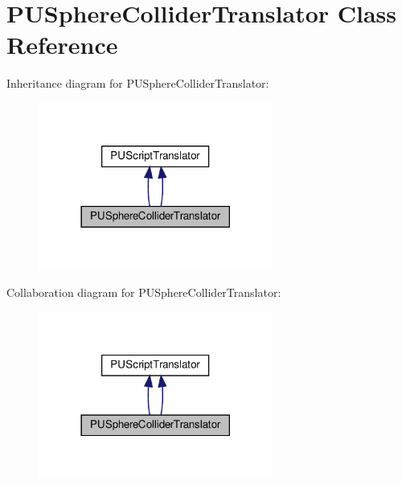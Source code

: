 \hypertarget{classPUSphereColliderTranslator}{}\section{P\+U\+Sphere\+Collider\+Translator Class Reference}
\label{classPUSphereColliderTranslator}


Inheritance diagram for P\+U\+Sphere\+Collider\+Translator\+:
\nopagebreak
\begin{figure}[H]
\begin{center}
\leavevmode
\includegraphics[width=218pt]{classPUSphereColliderTranslator__inherit__graph}
\end{center}
\end{figure}


Collaboration diagram for P\+U\+Sphere\+Collider\+Translator\+:
\nopagebreak
\begin{figure}[H]
\begin{center}
\leavevmode
\includegraphics[width=218pt]{classPUSphereColliderTranslator__coll__graph}
\end{center}
\end{figure}
